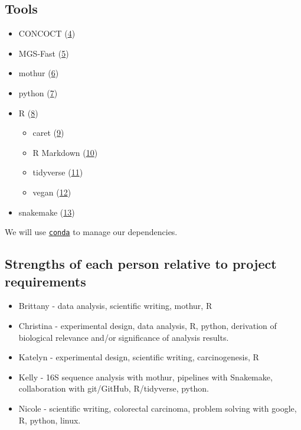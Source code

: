 \documentclass[11pt,]{article}
\providecommand{\tightlist}{%
  \setlength{\itemsep}{0pt}\setlength{\parskip}{0pt}}
\begin{document}
\hypertarget{tools}{%
\subsection{Tools}\label{tools}}

\begin{itemize}
\tightlist
\item
  CONCOCT (\protect\hyperlink{ref-alneberg_binning_2014}{4})
\item
  MGS-Fast (\protect\hyperlink{ref-brown_mgs-fast_2019}{5})
\item
  mothur (\protect\hyperlink{ref-schloss_introducing_2009}{6})
\item
  python (\protect\hyperlink{ref-python}{7})
\item
  R (\protect\hyperlink{ref-R}{8})

  \begin{itemize}
  \tightlist
  \item
    caret (\protect\hyperlink{ref-kuhn_building_2008}{9})
  \item
    R Markdown (\protect\hyperlink{ref-rmarkdown}{10})
  \item
    tidyverse (\protect\hyperlink{ref-wickham_welcome_2019}{11})
  \item
    vegan (\protect\hyperlink{ref-vegan}{12})
  \end{itemize}
\item
  snakemake (\protect\hyperlink{ref-snakemake}{13})
\end{itemize}

We will use \href{https://docs.conda.io/en/latest/}{\texttt{conda}} to
manage our dependencies.

\hypertarget{strengths-of-each-person-relative-to-project-requirements}{%
\subsection{Strengths of each person relative to project
requirements}\label{strengths-of-each-person-relative-to-project-requirements}}

\begin{itemize}
\tightlist
\item
  Brittany - data analysis, scientific writing, mothur, R
\item
  Christina - experimental design, data analysis, R, python, derivation
  of biological relevance and/or significance of analysis results.
\item
  Katelyn - experimental design, scientific writing, carcinogenesis, R
\item
  Kelly - 16S sequence analysis with mothur, pipelines with Snakemake,
  collaboration with git/GitHub, R/tidyverse, python.
\item
  Nicole - scientific writing, colorectal carcinoma, problem solving
  with google, R, python, linux.
\end{itemize}
\end{document}

